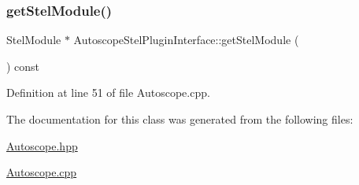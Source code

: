 \subsubsection{\texorpdfstring{getStelModule()}{getStelModule()}}
{\footnotesize\ttfamily Stel\+Module $\ast$ Autoscope\+Stel\+Plugin\+Interface\+::get\+Stel\+Module (\begin{DoxyParamCaption}{ }\end{DoxyParamCaption}) const\hspace{0.3cm}{\ttfamily [virtual]}}



Definition at line 51 of file Autoscope.\+cpp.


\begin{DoxyCode}{0}

\end{DoxyCode}


The documentation for this class was generated from the following files\+:\begin{DoxyCompactItemize}
\item 
\mbox{\hyperlink{_autoscope_8hpp}{Autoscope.\+hpp}}\item 
\mbox{\hyperlink{_autoscope_8cpp}{Autoscope.\+cpp}}\end{DoxyCompactItemize}
